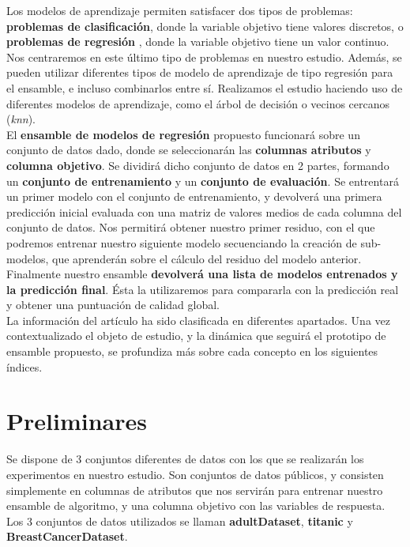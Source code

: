 \documentclass[conference,a4paper]{IEEEtran}
\begin{document}
Los modelos de aprendizaje permiten satisfacer dos tipos de problemas: \textbf{problemas de clasificación}, donde la variable objetivo tiene valores discretos, o \textbf{problemas de regresión} \cite{b1}, donde la variable objetivo tiene un valor continuo. Nos centraremos en este último tipo de problemas en nuestro estudio. Además, se pueden utilizar diferentes tipos de modelo de aprendizaje de tipo regresión para el ensamble, e incluso combinarlos entre sí. Realizamos el estudio haciendo uso de diferentes modelos de aprendizaje, como el árbol de decisión o vecinos cercanos (\textit{knn})\cite{b5}. \\

El \textbf{ensamble de modelos de regresión} \cite{b2} propuesto funcionará sobre un conjunto de datos dado, donde se seleccionarán las \textbf{columnas atributos} y \textbf{columna objetivo}. Se dividirá dicho conjunto de datos en 2 partes, formando un \textbf{conjunto de entrenamiento} y un \textbf{conjunto de evaluación}. Se entrentará un primer modelo con el conjunto de entrenamiento, y devolverá una primera predicción inicial evaluada con una matriz de valores medios de cada columna del conjunto de datos. Nos permitirá obtener nuestro primer residuo, con el que podremos entrenar nuestro siguiente modelo secuenciando la creación de sub-modelos, que aprenderán sobre el cálculo del residuo del modelo anterior. \\

Finalmente nuestro ensamble \textbf{devolverá una lista de modelos entrenados y la predicción final}. Ésta la  utilizaremos para compararla con la predicción real y obtener una puntuación de calidad global.\\

La información del artículo ha sido clasificada en diferentes apartados. Una vez contextualizado el objeto de estudio, y la dinámica que seguirá el prototipo de ensamble propuesto, se profundiza más sobre cada concepto en los siguientes índices.


\section{Preliminares}

Se dispone de 3 conjuntos diferentes de datos \cite{b8, b9, b10} con los que se realizarán los experimentos en nuestro estudio. Son conjuntos de datos públicos, y consisten simplemente en columnas de atributos que nos servirán para entrenar nuestro ensamble de algoritmo, y una columna objetivo con las variables de respuesta. Los 3 conjuntos de datos utilizados se llaman \textbf{adultDataset}\cite{b8}, \textbf{titanic}\cite{b9} y \textbf{BreastCancerDataset}\cite{b10}.\\
\end{document}
